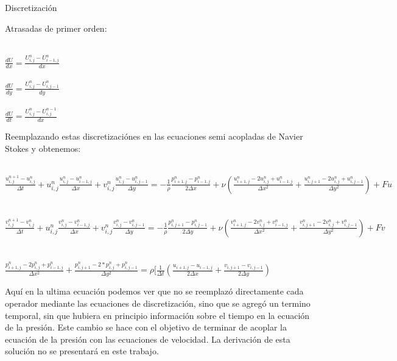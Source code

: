\begin{section}{Discretización}
\begin{minipage}{\linewidth}
\end{minipage}
\begin{minipage}{\linewidth}


Atrasadas de primer orden:

~\\
$\frac{dU}{dx} = \frac{U^{n}_{i,j} - U^{n}_{i-1,j}}{dx} $
~\\
~\\
$\frac{dU}{dy} = \frac{U^{n}_{i,j} - U^{n}_{i,j-1}}{dy} $
~\\
~\\
$\frac{dU}{dt} = \frac{U^{n}_{i,j} - U^{n-1}_{i,j}}{dx} $
~\\


\end{minipage}
\begin{minipage}{\linewidth}

Reemplazando estas discretizaciónes en las ecuaciones semi acopladas de Navier Stokes y obtenemos: 

~\\
$\frac{u_{i,j}^{n+1}-u_{i,j}^{n}}{\Delta t}+u_{i,j}^{n}\frac{u_{i,j}^{n}-u_{i-1,j}^{n}}{\Delta x}+v_{i,j}^{n}\frac{u_{i,j}^{n}-u_{i,j-1}^{n}}{\Delta y}
=-\frac{1}{\rho}\frac{p_{i+1,j}^{n}-p_{i-1,j}^{n}}{2\Delta x}+\nu (\frac{u_{i+1,j}^{n}-2u_{i,j}^{n}+u_{i-1,j}^{n}}{\Delta x^2}+\frac{u_{i,j+1}^{n}-2u_{i,j}^{n}+u_{i,j-1}^{n}}{\Delta y^2}) + Fu$
~\\
~\\
$\frac{v_{i,j}^{n+1}-v_{i,j}^{n}}{\Delta t}+u_{i,j}^{n}\frac{v_{i,j}^{n}-v_{i-1,j}^{n}}{\Delta x}+v_{i,j}^{n}\frac{v_{i,j}^{n}-v_{i,j-1}^{n}}{\Delta y}=-\frac{1}{\rho}\frac{p_{i,j+1}^{n}-p_{i,j-1}^{n}}{2\Delta y}
+\nu(\frac{v_{i+1,j}^{n}-2v_{i,j}^{n}+v_{i-1,j}^{n}}{\Delta x^2}+\frac{v_{i,j+1}^{n}-2v_{i,j}^{n}+v_{i,j-1}^{n}}{\Delta y^2}) + Fv$
~\\
~\\
$\frac{p_{i+1,j}^{n}-2p_{i,j}^{n}+p_{i-1,j}^{n}}{\Delta x^2}+\frac{p_{i,j+1}^{n}-2*p_{i,j}^{n}+p_{i,j-1}^{n}}{\Delta y^2} 
=\rho[\frac{1}{\Delta t}(\frac{u_{i+1,j}-u_{i-1,j}}{2\Delta x}+\frac{v_{i,j+1}-v_{i,j-1}}{2\Delta y})$


\end{minipage}

\begin{minipage}{\linewidth}
Aquí en la ultima ecuación podemos ver que no se reemplazó directamente cada operador mediante las ecuaciones de discretización, sino que se agregó un termino temporal, sin que hubiera en principio información sobre el tiempo en la ecuación de la presión. Este cambio se hace con el objetivo de terminar de acoplar la ecuación de la presión con las ecuaciones de velocidad. La derivación de esta solución no se presentará en este trabajo.
~\\


\end{minipage}
\end{section}
